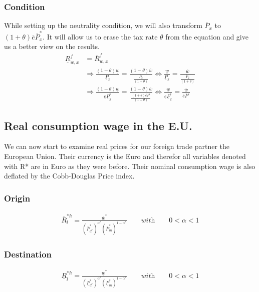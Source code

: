 \subsubsection*{Condition}
While setting up the neutrality condition, we will also transform $\overline P_x$ to $(1+\theta)\overline e \overline P_x^*$. It will allow us to erase the tax rate $\theta$ from the equation and give us a better view on the results.
\begin{equation}\label{proxw.con}
\begin{aligned}
    \underline R^f_{w, x} &= \overline R^f_{w, x} \\ &\Rightarrow \frac{ \left( 1-\theta \right) \underline w}{\underline P_x} = \frac{ \left( 1-\theta \right) \overline w}{\frac{\overline P_x}{ \left( 1+\theta \right) }} \Leftrightarrow \frac{\underline w}{\underline P_x} = \frac{\overline w}{\frac{\overline P_x}{ \left( 1+\theta \right) }} \\ &\Rightarrow \frac{ \left( 1-\theta \right) \underline w}{\underline e \underline P^*_x} = \frac{ \left( 1-\theta \right) \overline w}{\frac{ \left( 1+\theta \right) \overline e \overline P^_x}{ \left( 1+\theta \right) }} \Leftrightarrow  \frac{\underline w}{\underline e \underline P^*_x} = \frac{\overline w}{\overline e \overline P^_x} 
\end{aligned}  
\end{equation}

\subsection*{Real consumption wage in the E.U.} 
We can now start to examine real prices for our foreign trade partner the European Union. Their currency is the Euro and therefor all variables denoted with R* are in Euro as they were before. Their nominal consumption wage is also deflated by the Cobb-Douglas Price index.
\subsubsection*{Origin}
\begin{equation}\label{conweu.o}
\begin{aligned}
\overline R^{*h}_l = \frac{\overline w^*}{ \left( \overline P^*_{d^*} \right) ^{\alpha^*}  \left( \overline P^*_m \right) ^{1-\alpha^*}}\qquad \textit{with} \qquad 0 < \alpha < 1 \end{aligned}  \end{equation}

\subsubsection*{Destination}
\begin{equation}\label{conweu.d} 
\begin{aligned}
\underline R^{*h}_l = \frac{\underline w^*}{ \left( \underline P^*_{d^*} \right) ^{\alpha^*}  \left( \underline P^*_m \right) ^{1-\alpha^*}}\qquad \textit{with} \qquad 0 < \alpha < 1 \end{aligned}  \end{equation}

